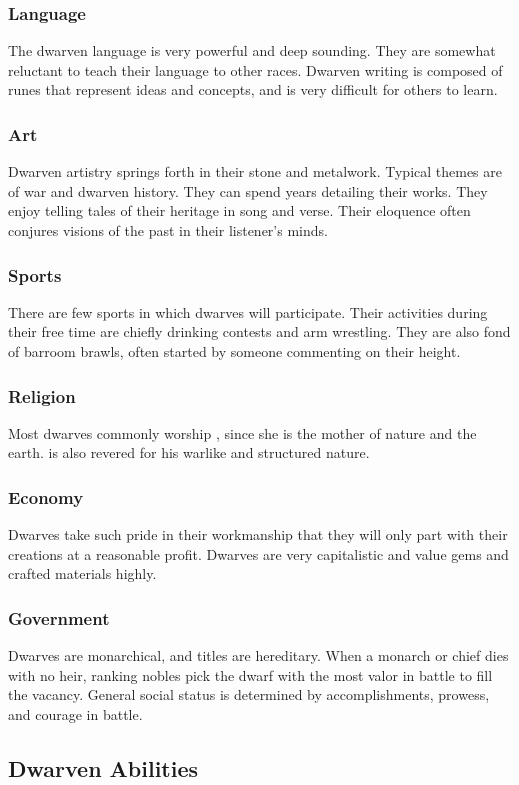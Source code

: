 \begin{multicols*}{2}
\subsubsection{Language}
The dwarven language is very powerful and deep sounding. They are somewhat reluctant to teach their language to other races. Dwarven writing is composed of runes that represent ideas and concepts, and is very difficult for others to learn.
\subsubsection{Art}
Dwarven artistry springs forth in their stone and metalwork. Typical themes are of war and dwarven history. They can spend years detailing their works. They enjoy telling tales of their heritage in song and verse. Their eloquence often conjures visions of the past in their listener's minds.
\subsubsection{Sports}
There are few sports in which dwarves will participate. Their activities during their free time are chiefly drinking contests and arm wrestling. They are also fond of barroom brawls, often started by someone commenting on their height.
\subsubsection{Religion}
Most dwarves commonly worship , since she is the mother of nature and the earth.  is also revered for his warlike and structured nature.
\subsubsection{Economy}
Dwarves take such pride in their workmanship that they will only part with their creations at a reasonable profit. Dwarves are very capitalistic and value gems and crafted materials highly.
\subsubsection{Government}
Dwarves are monarchical, and titles are hereditary. When a monarch or chief dies with no heir, ranking nobles pick the dwarf with the most valor in battle to fill the vacancy. General social status is determined by accomplishments, prowess, and courage in battle.
\subsection{Dwarven Abilities}

\end{multicols*}
